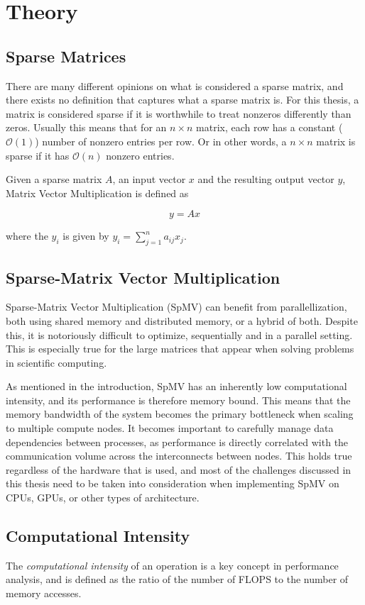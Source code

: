 
\chapter{Theory}
\section{Sparse Matrices}
There are many different opinions on what is considered a sparse matrix, and there exists no definition that captures what a sparse matrix is. For this thesis, a matrix is considered sparse if it is worthwhile to treat nonzeros differently than zeros. Usually this means that for an \(n \times n\) matrix, each row has a constant (\(\mathcal{O}\left(1\right)\)) number of nonzero entries per row. Or in other words, a \(n \times  n\) matrix is sparse if it has \(\mathcal{O}\left(n\right)\) nonzero entries.
\medskip

Given a sparse matrix \(A\), an input vector \(x\) and the resulting output vector \(y\), Matrix Vector Multiplication is defined as

\[y = Ax\]

where the \(y_{i}\) is given by \(y_{i} = \sum_{j=1}^{n}a_{ij}x_{j} \).

\section{Sparse-Matrix Vector Multiplication}
Sparse-Matrix Vector Multiplication (SpMV) can benefit from parallellization, both using shared memory and distributed memory, or a hybrid of both. Despite this, it is notoriously difficult to optimize, sequentially and in a parallel setting. This is especially true for the large matrices that appear when solving problems in scientific computing.
\medskip

As mentioned in the introduction, SpMV has an inherently low computational intensity, and its performance is therefore memory bound. This means that the memory bandwidth of the system becomes the primary bottleneck when scaling to multiple compute nodes. It becomes important to carefully manage data dependencies between processes, as performance is directly correlated with the communication volume across the interconnects between nodes. This holds true regardless of the hardware that is used, and most of the challenges discussed in this thesis need to be taken into consideration when implementing SpMV on CPUs, GPUs, or other types of architecture.


\section{Computational Intensity}
The \textit{computational intensity} of an operation is a key concept in performance analysis, and is defined as the ratio of the number of FLOPS to the number of memory accesses.

